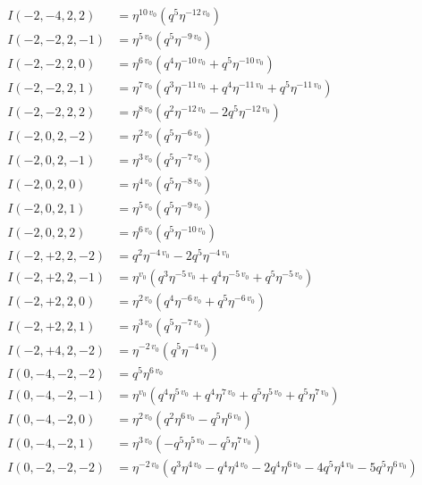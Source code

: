 \documentclass[11pt,a4paper]{article}
\begin{document}
\begin{align*}
I(-2, -4, 2, 2) &= \eta^{10 \, v_{0}} \left( q^{5} \eta^{-12 \, v_{0}} \right) \\
I(-2, -2, 2, -1) &= \eta^{5 \, v_{0}} \left( q^{5} \eta^{-9 \, v_{0}} \right) \\
I(-2, -2, 2, 0) &= \eta^{6 \, v_{0}} \left( q^{4} \eta^{-10 \, v_{0}} + q^{5} \eta^{-10 \, v_{0}} \right) \\
I(-2, -2, 2, 1) &= \eta^{7 \, v_{0}} \left( q^{3} \eta^{-11 \, v_{0}} + q^{4} \eta^{-11 \, v_{0}} + q^{5} \eta^{-11 \, v_{0}} \right) \\
I(-2, -2, 2, 2) &= \eta^{8 \, v_{0}} \left( q^{2} \eta^{-12 \, v_{0}} - 2 q^{5} \eta^{-12 \, v_{0}} \right) \\
I(-2, 0, 2, -2) &= \eta^{2 \, v_{0}} \left( q^{5} \eta^{-6 \, v_{0}} \right) \\
I(-2, 0, 2, -1) &= \eta^{3 \, v_{0}} \left( q^{5} \eta^{-7 \, v_{0}} \right) \\
I(-2, 0, 2, 0) &= \eta^{4 \, v_{0}} \left( q^{5} \eta^{-8 \, v_{0}} \right) \\
I(-2, 0, 2, 1) &= \eta^{5 \, v_{0}} \left( q^{5} \eta^{-9 \, v_{0}} \right) \\
I(-2, 0, 2, 2) &= \eta^{6 \, v_{0}} \left( q^{5} \eta^{-10 \, v_{0}} \right) \\
I(-2, +2, 2, -2) &= q^{2} \eta^{-4 \, v_{0}} - 2 q^{5} \eta^{-4 \, v_{0}} \\
I(-2, +2, 2, -1) &= \eta^{v_{0}} \left( q^{3} \eta^{-5 \, v_{0}} + q^{4} \eta^{-5 \, v_{0}} + q^{5} \eta^{-5 \, v_{0}} \right) \\
I(-2, +2, 2, 0) &= \eta^{2 \, v_{0}} \left( q^{4} \eta^{-6 \, v_{0}} + q^{5} \eta^{-6 \, v_{0}} \right) \\
I(-2, +2, 2, 1) &= \eta^{3 \, v_{0}} \left( q^{5} \eta^{-7 \, v_{0}} \right) \\
I(-2, +4, 2, -2) &= \eta^{-2 \, v_{0}} \left( q^{5} \eta^{-4 \, v_{0}} \right) \\
I(0, -4, -2, -2) &= q^{5} \eta^{6 \, v_{0}} \\
I(0, -4, -2, -1) &= \eta^{v_{0}} \left( q^{4} \eta^{5 \, v_{0}} + q^{4} \eta^{7 \, v_{0}} + q^{5} \eta^{5 \, v_{0}} + q^{5} \eta^{7 \, v_{0}} \right) \\
I(0, -4, -2, 0) &= \eta^{2 \, v_{0}} \left( q^{2} \eta^{6 \, v_{0}} - q^{5} \eta^{6 \, v_{0}} \right) \\
I(0, -4, -2, 1) &= \eta^{3 \, v_{0}} \left( -q^{5} \eta^{5 \, v_{0}} - q^{5} \eta^{7 \, v_{0}} \right) \\
I(0, -2, -2, -2) &= \eta^{-2 \, v_{0}} \left( q^{3} \eta^{4 \, v_{0}} - q^{4} \eta^{4 \, v_{0}} - 2 q^{4} \eta^{6 \, v_{0}} - 4 q^{5} \eta^{4 \, v_{0}} - 5 q^{5} \eta^{6 \, v_{0}} \right) \\

\end{align*}
\end{document}

